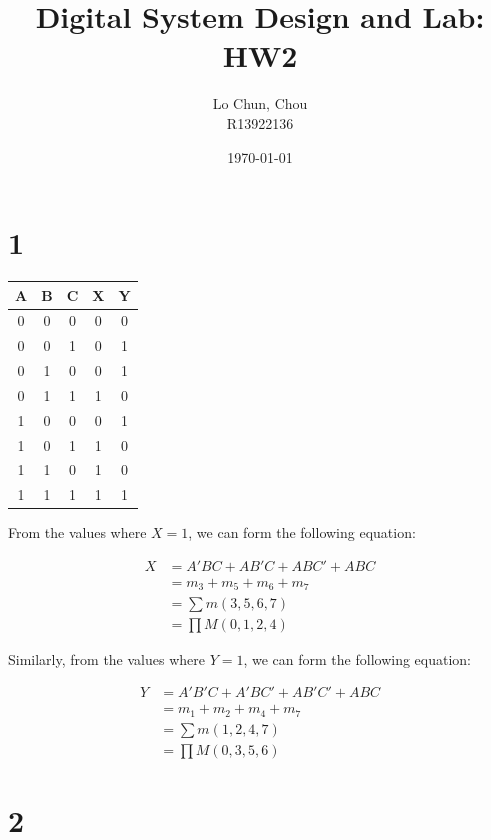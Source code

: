 \documentclass{article}
\title{Digital System Design and Lab: HW2}
\author{Lo Chun, Chou \\ R13922136}
\date\today
\begin{document}
\setlength{\parindent}{0pt}
\maketitle 

\section*{1}

\begin{center}
    \begin{tabular}{ |c|c|c||c|c| } 
        \hline
        \cline{1-5}
        A & B & C & X & Y\\ 
        \hline
        0 & 0 & 0 & 0 & 0 \\ 
        0 & 0 & 1 & 0 & 1 \\ 
        0 & 1 & 0 & 0 & 1 \\ 
        0 & 1 & 1 & 1 & 0 \\ 
        1 & 0 & 0 & 0 & 1 \\
        1 & 0 & 1 & 1 & 0 \\ 
        1 & 1 & 0 & 1 & 0 \\ 
        1 & 1 & 1 & 1 & 1 \\ 
        \hline
    \end{tabular}
\end{center}

From the values where $X=1$, we can form the following equation:

\begin{align*}
    X 
    &= A'BC + AB'C + ABC' + ABC \\
    &= m_3 + m_5 + m_6 + m_7 \\
    &= \sum m(3, 5, 6, 7) \\
    &= \prod M(0, 1, 2, 4)
\end{align*}

Similarly, from the values where $Y=1$, we can form the following equation:

\begin{align*}
    Y
    &= A'B'C + A'BC' + AB'C' + ABC \\
    &= m_1 + m_2 + m_4 + m_7 \\
    &= \sum m(1, 2, 4, 7) \\
    &= \prod M(0, 3, 5, 6)
\end{align*}

\section*{2}
\end{document}
